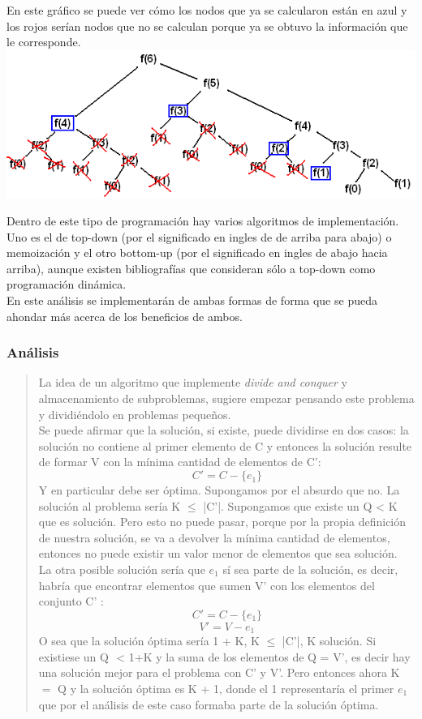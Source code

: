 \documentclass[8pt,a4paper]{article}
\begin{document}
\begin{center}
En este gráfico se puede ver cómo los nodos que ya se calcularon están en azul y los rojos serían nodos que no se calculan porque ya se obtuvo la información que le corresponde.
\includegraphics[scale=.4]{fibonacci_pd.png}
\end{center}

Dentro de este tipo de programación hay varios  algoritmos de implementación. Uno es el de top-down (por el significado en ingles de de arriba para abajo) o memoización y el otro bottom-up (por el significado en ingles de abajo hacia arriba), aunque existen bibliografías que consideran sólo a top-down como programación dinámica.
\\
En este análisis se implementarán de ambas formas de forma que se pueda ahondar más acerca de los beneficios de ambos. 
\bigskip
\subsubsection{Análisis}
\begin{verse}
La idea de un algoritmo que implemente {\it divide and conquer} y almacenamiento de subproblemas, sugiere empezar pensando este problema y dividiéndolo en problemas pequeños.\\
Se puede afirmar que la solución, si existe, puede dividirse en dos casos: la solución no contiene al primer elemento de C y entonces la solución resulte de formar V con la mínima cantidad de elementos de C': 
\[ C' = C - \{e_{1}\}\]
Y en particular debe ser óptima. Supongamos por el absurdo que no. La solución al problema sería K $\leq$ |C'|. Supongamos que existe un Q < K que es solución. Pero esto no puede pasar, porque por la propia definición de nuestra solución, se va a devolver la mínima cantidad de elementos, entonces no puede existir un valor menor de elementos que sea solución.
\\
La otra posible solución sería que $e_{1}$ sí sea parte de la solución, es decir, habría que encontrar elementos que sumen V' con los elementos del conjunto C' :
 \[ C' = C - \{e_{1}\}\]
\[ V' = V - e_{1}\]
O sea que la solución óptima sería 1 + K, K $\leq $ |C'|, K solución. Si existiese un Q $ $ < $ $1+K y la suma de los elementos de Q = V', es decir hay una solución mejor para el problema con C' y V'. Pero entonces ahora K $=$ Q y la solución óptima es K + 1, donde el 1 representaría el primer $e_{1}$ que por el análisis de este caso formaba parte de la solución óptima.
\end{verse}
\end{document}
